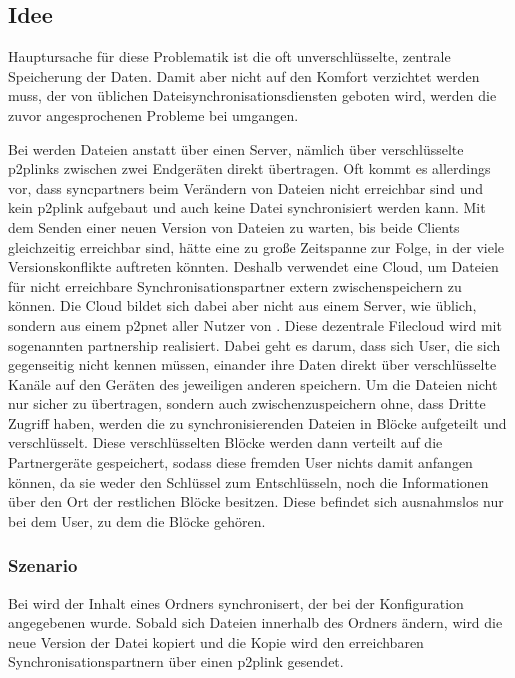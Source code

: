 \subsection{Idee}
Hauptursache für diese Problematik ist die oft unverschlüsselte, zentrale
Speicherung der Daten. Damit aber nicht auf den Komfort verzichtet werden muss,
der von üblichen Dateisynchronisationsdiensten geboten wird, werden die zuvor angesprochenen
Probleme bei \sblit umgangen.

Bei \sblit werden Dateien anstatt über einen Server, nämlich über verschlüsselte
\glspl{p2plink} zwischen zwei Endgeräten direkt übertragen.
Oft kommt es allerdings vor, dass \glspl{syncpartner} beim Verändern von
Dateien nicht erreichbar sind und kein \gls{p2plink} aufgebaut und auch
keine Datei synchronisiert werden kann.
Mit dem Senden einer neuen Version von Dateien zu warten,
bis beide Clients gleichzeitig erreichbar sind, hätte eine zu große Zeitspanne
zur Folge, in der viele Versionskonflikte auftreten könnten.
Deshalb verwendet \sblit eine Cloud, um Dateien für nicht erreichbare
Synchronisationspartner extern zwischenspeichern zu können. Die Cloud bildet
sich dabei aber nicht aus einem Server, wie üblich, sondern aus einem \gls{p2pnet}
aller Nutzer von \sblit. Diese dezentrale \gls{Filecloud} wird
mit sogenannten \gls{partnership} realisiert. Dabei geht es darum, dass sich
User, die sich gegenseitig nicht kennen müssen, einander ihre Daten direkt über
verschlüsselte Kanäle auf den Geräten des jeweiligen anderen speichern.
Um die Dateien nicht nur sicher zu übertragen, sondern auch zwischenzuspeichern
ohne, dass Dritte Zugriff haben, werden die zu
synchronisierenden Dateien in Blöcke aufgeteilt und verschlüsselt. Diese
verschlüsselten Blöcke werden dann verteilt auf die Partnergeräte gespeichert,
sodass diese fremden User nichts damit anfangen können, da sie weder den
Schlüssel zum Entschlüsseln, noch die Informationen über den Ort der restlichen
Blöcke besitzen. Diese befindet sich ausnahmslos nur bei dem User, zu dem die
Blöcke gehören.

\subsubsection{Szenario}
Bei \sblit wird der Inhalt eines Ordners synchronisert, der bei der
Konfiguration angegebenen wurde. Sobald sich Dateien innerhalb des Ordners
ändern, wird die neue Version der Datei kopiert und die Kopie wird den
erreichbaren Synchronisationspartnern über einen \gls{p2plink}
gesendet.

